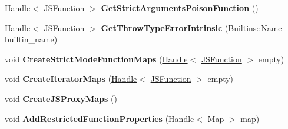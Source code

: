 \begin{DoxyCompactItemize}
\item 
\hyperlink{classv8_1_1internal_1_1_handle}{Handle}$<$ \hyperlink{classv8_1_1internal_1_1_j_s_function}{J\+S\+Function} $>$ {\bfseries Get\+Strict\+Arguments\+Poison\+Function} ()\hypertarget{classv8_1_1internal_1_1_b_a_s_e___e_m_b_e_d_d_e_d_a240afb5914b47030af847eb358c0a64c}{}\label{classv8_1_1internal_1_1_b_a_s_e___e_m_b_e_d_d_e_d_a240afb5914b47030af847eb358c0a64c}

\item 
\hyperlink{classv8_1_1internal_1_1_handle}{Handle}$<$ \hyperlink{classv8_1_1internal_1_1_j_s_function}{J\+S\+Function} $>$ {\bfseries Get\+Throw\+Type\+Error\+Intrinsic} (Builtins\+::\+Name builtin\+\_\+name)\hypertarget{classv8_1_1internal_1_1_b_a_s_e___e_m_b_e_d_d_e_d_a7fdd83fe6009626fc1f78846ef0fc439}{}\label{classv8_1_1internal_1_1_b_a_s_e___e_m_b_e_d_d_e_d_a7fdd83fe6009626fc1f78846ef0fc439}

\item 
void {\bfseries Create\+Strict\+Mode\+Function\+Maps} (\hyperlink{classv8_1_1internal_1_1_handle}{Handle}$<$ \hyperlink{classv8_1_1internal_1_1_j_s_function}{J\+S\+Function} $>$ empty)\hypertarget{classv8_1_1internal_1_1_b_a_s_e___e_m_b_e_d_d_e_d_a95d1c49a04f9babde8f90337a4bd758f}{}\label{classv8_1_1internal_1_1_b_a_s_e___e_m_b_e_d_d_e_d_a95d1c49a04f9babde8f90337a4bd758f}

\item 
void {\bfseries Create\+Iterator\+Maps} (\hyperlink{classv8_1_1internal_1_1_handle}{Handle}$<$ \hyperlink{classv8_1_1internal_1_1_j_s_function}{J\+S\+Function} $>$ empty)\hypertarget{classv8_1_1internal_1_1_b_a_s_e___e_m_b_e_d_d_e_d_a2828793ebd9f4ce28fc7efd9d0733445}{}\label{classv8_1_1internal_1_1_b_a_s_e___e_m_b_e_d_d_e_d_a2828793ebd9f4ce28fc7efd9d0733445}

\item 
void {\bfseries Create\+J\+S\+Proxy\+Maps} ()\hypertarget{classv8_1_1internal_1_1_b_a_s_e___e_m_b_e_d_d_e_d_af091b5ce40332e1b5d56b97f5b3ab639}{}\label{classv8_1_1internal_1_1_b_a_s_e___e_m_b_e_d_d_e_d_af091b5ce40332e1b5d56b97f5b3ab639}

\item 
void {\bfseries Add\+Restricted\+Function\+Properties} (\hyperlink{classv8_1_1internal_1_1_handle}{Handle}$<$ \hyperlink{classv8_1_1internal_1_1_map}{Map} $>$ map)\hypertarget{classv8_1_1internal_1_1_b_a_s_e___e_m_b_e_d_d_e_d_a1627308e83f875562be07a700c9291ca}{}\label{classv8_1_1internal_1_1_b_a_s_e___e_m_b_e_d_d_e_d_a1627308e83f875562be07a700c9291ca}


\end{DoxyCompactItemize}

